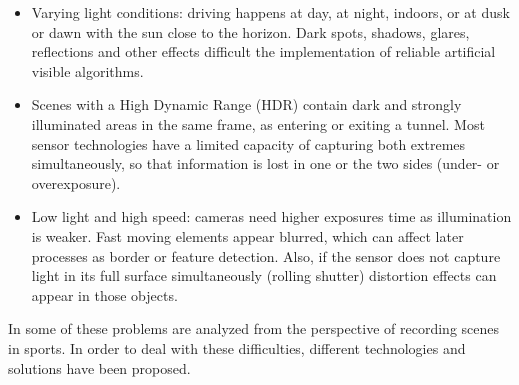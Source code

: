 \begin{itemize}
    \item Varying light conditions: driving happens at day, at night, indoors, 
    or at dusk or dawn with the sun close to the horizon. 
    Dark spots, shadows, glares, reflections and other effects difficult the
    implementation of reliable artificial visible algorithms.
    
    \item Scenes with a High Dynamic Range (HDR) contain dark and strongly
    illuminated areas in the same frame, as entering or exiting a tunnel.
    Most sensor technologies have a limited capacity of capturing both extremes
    simultaneously, so that information is lost in one or the two sides (under- 
    or overexposure). 
        
    \item Low light and high speed: cameras need higher exposures time as
    illumination is weaker. Fast moving elements appear blurred, which can 
    affect later processes as border or feature detection. Also, if the sensor
    does not capture light in its full surface simultaneously (rolling shutter)
    distortion effects can appear in those objects.
\end{itemize}

In \cite{Pueo2016} some of these problems are analyzed from the perspective of
recording scenes in sports.
In order to deal with these difficulties, different technologies and solutions 
have been proposed. 


